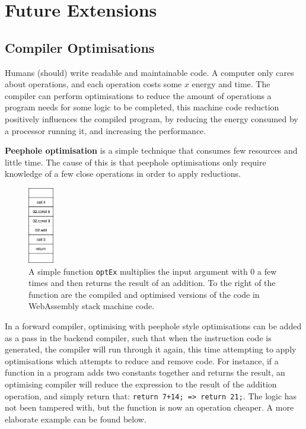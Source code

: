 \documentclass[a4paper]{article}
\begin{document}
\section{Future Extensions}

\subsection{Compiler Optimisations}
Humans (should) write readable and maintainable code. A computer only cares about operations, and each operation costs some $x$ energy and time. The compiler can perform optimisations to reduce the amount of operations a program needs for some logic to be completed, this machine code reduction positively influences the compiled program, by reducing the energy consumed by a processor running it, and increasing the performance.

\textbf{Peephole optimisation} is a simple technique that consumes few resources and little time. The cause of this is that peephole optimisations only require knowledge of a few close operations in order to apply reductions.

\begin{figure}
\includegraphics[width=0.1\textwidth]{PeepholeOptimisationIllustration}
\centering
\caption{A simple function \texttt{optEx} multiplies the input argument with $0$ a few times and then returns the result of an addition. To the right of the function are the compiled and optimised versions of the code in WebAssembly stack machine code.}
\end{figure}

In a forward compiler, optimising with peephole style optimisations can be added as a pass in the backend compiler, such that when the instruction code is generated, the compiler will run through it again, this time attempting to apply optimisations which attempts to reduce and remove code. For instance, if a function in a program adds two constants together and returns the result, an optimising compiler will reduce the expression to the result of the addition operation, and simply return that: \texttt{return 7+14; => return 21;}. The logic has not been tampered with, but the function is now an operation cheaper. A more elaborate example can be found below.
\end{document}
